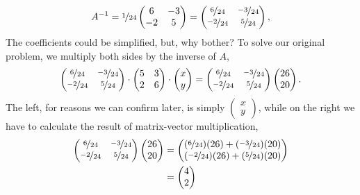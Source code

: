 \documentclass{article}
\begin{document}
\[A^{-1} = \nicefrac{1}{24}\begin{pmatrix}6&-3\\-2&5\end{pmatrix} = \begin{pmatrix}\nicefrac{6}{24}&\nicefrac{-3}{24}\\\nicefrac{-2}{24}&\nicefrac{5}{24}\end{pmatrix},\] The coefficients could be simplified, but, why bother? To solve our original problem, we multiply both sides by the inverse of \(A\), \[\begin{pmatrix}\nicefrac{6}{24}&\nicefrac{-3}{24}\\\nicefrac{-2}{24}&\nicefrac{5}{24}\end{pmatrix}\cdot \begin{pmatrix}5&3\\2&6\end{pmatrix} \cdot \begin{pmatrix}x\\y\end{pmatrix} = \begin{pmatrix}\nicefrac{6}{24}&\nicefrac{-3}{24}\\\nicefrac{-2}{24}&\nicefrac{5}{24}\end{pmatrix}\begin{pmatrix}26\\20\end{pmatrix}.\] The left, for reasons we can confirm later, is simply \(\begin{pmatrix}x\\y\end{pmatrix}\), while on the right we have to calculate the result of matrix-vector multiplication,\begin{align*}
\begin{pmatrix}\nicefrac{6}{24}&\nicefrac{-3}{24}\\\nicefrac{-2}{24}&\nicefrac{5}{24}\end{pmatrix}\begin{pmatrix}26\\20\end{pmatrix} &= \begin{pmatrix}(\nicefrac{6}{24})(26) + (\nicefrac{-3}{24})(20)\\(\nicefrac{-2}{24})(26) + (\nicefrac{5}{24})(20)\end{pmatrix}\\
&= \begin{pmatrix}4\\2\end{pmatrix}
\end{align*}
\end{document}
